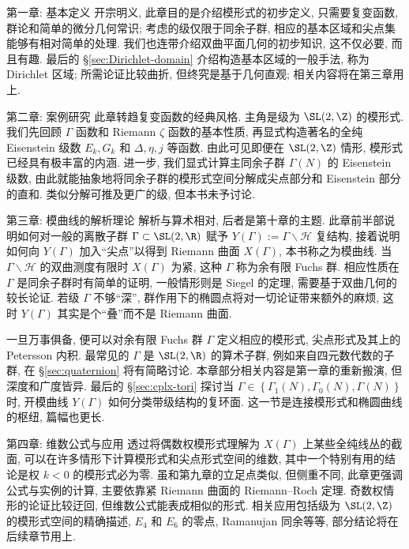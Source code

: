 \begin{asparadesc}
	\item[第一章: 基本定义] 开宗明义, 此章目的是介绍模形式的初步定义, 只需要复变函数, 群论和简单的微分几何常识; 考虑的级仅限于同余子群, 相应的基本区域和尖点集能够有相对简单的处理. 我们也连带介绍双曲平面几何的初步知识, 这不仅必要, 而且有趣. 最后的 \S\ref{sec:Dirichlet-domain} 介绍构造基本区域的一般手法, 称为 Dirichlet 区域; 所需论证比较曲折, 但终究是基于几何直观; 相关内容将在第三章用上.

	\item[第二章: 案例研究] 此章转趋复变函数的经典风格. 主角是级为 $\SL(2, \Z)$ 的模形式. 我们先回顾 $\Gamma$ 函数和 Riemann $\zeta$ 函数的基本性质, 再显式构造著名的全纯 Eisenstein 级数 $E_k, G_k$ 和 $\Delta, \eta, j$ 等函数. 由此可见即便在 $\SL(2, \Z)$ 情形, 模形式已经具有极丰富的内涵. 进一步, 我们显式计算主同余子群 $\Gamma(N)$ 的 Eisenstein 级数, 由此就能抽象地将同余子群的模形式空间分解成尖点部分和 Eisenstein 部分的直和. 类似分解可推及更广的级, 但本书未予讨论.
	
	\item[第三章: 模曲线的解析理论] 解析与算术相对, 后者是第十章的主题. 此章前半部说明如何对一般的离散子群 $\Gamma \subset \SL(2, \R)$ 赋予 $Y(\Gamma) := \Gamma \backslash \mathcal{H}$ 复结构, 接着说明如何向 $Y(\Gamma)$ 加入``尖点''以得到 Riemann 曲面 $X(\Gamma)$, 本书称之为模曲线. 当 $\Gamma \backslash \mathcal{H}$ 的双曲测度有限时 $X(\Gamma)$ 为紧, 这种 $\Gamma$ 称为余有限 Fuchs 群. 相应性质在 $\Gamma$ 是同余子群时有简单的证明, 一般情形则是 Siegel 的定理, 需要基于双曲几何的较长论证. 若级 $\Gamma$ 不够``深'', 群作用下的椭圆点将对一切论证带来额外的麻烦, 这时 $Y(\Gamma)$ 其实是个``叠''而不是 Riemann 曲面.
	
	一旦万事俱备, 便可以对余有限 Fuchs 群 $\Gamma$ 定义相应的模形式, 尖点形式及其上的 Petersson 内积. 最常见的 $\Gamma$ 是 $\SL(2, \R)$ 的算术子群, 例如来自四元数代数的子群, 在 \S\ref{sec:quaternion} 将有简略讨论. 本章部分相关内容是第一章的重新搬演, 但深度和广度皆异. 最后的 \S\ref{sec:cplx-tori} 探讨当 $\Gamma \in \left\{ \Gamma_1(N), \Gamma_0(N), \Gamma(N) \right\}$ 时, 开模曲线 $Y(\Gamma)$ 如何分类带级结构的复环面. 这一节是连接模形式和椭圆曲线的枢纽, 篇幅也更长.

	\item[第四章: 维数公式与应用] 透过将偶数权模形式理解为 $X(\Gamma)$ 上某些全纯线丛的截面, 可以在许多情形下计算模形式和尖点形式空间的维数, 其中一个特别有用的结论是权 $k < 0$ 的模形式必为零. 虽和第九章的立足点类似, 但侧重不同, 此章更强调公式与实例的计算, 主要依靠紧 Riemann 曲面的 Riemann--Roch 定理. 奇数权情形的论证比较迂回, 但维数公式能表成相似的形式. 相关应用包括级为 $\SL(2, \Z)$ 的模形式空间的精确描述, $E_4$ 和 $E_6$ 的零点, Ramanujan 同余等等, 部分结论将在后续章节用上.


\end{asparadesc}
